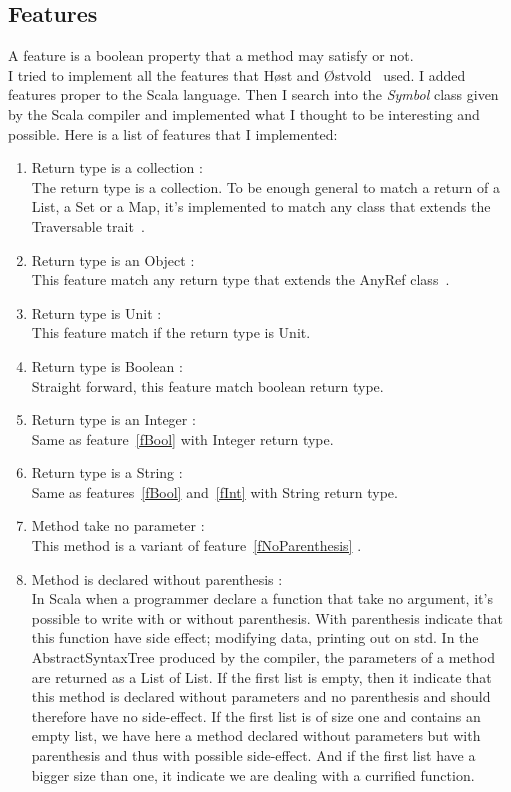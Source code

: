 \documentclass[12pt]{article}
\begin{document}
\subsection{Features}
\label{features}
A feature is a boolean property that a method may satisfy or not.\\
I tried to implement all the features that H{\o}st and {\O}stvold~\cite{DebugMN} used. I added features proper to the Scala language. Then I search into the \textit{Symbol} class given by the Scala compiler and implemented what I thought to be interesting and possible. Here is a list of features that I implemented:

\begin{enumerate}
\item Return type is a collection :\\
	The return type is a collection. To be enough general to match a return of a List, a Set or a Map, it's implemented to match any class that extends the Traversable trait~\cite{travers}.
\item Return type is an Object : \\
	This feature match any return type that extends the AnyRef class~\cite{anyRef}.
\item Return type is Unit :\\
	This feature match if the return type is Unit.
\item Return type is Boolean : \label{fBool}\\
	Straight forward, this feature match boolean return type.
\item Return type is an Integer :\label{fInt}\\
	Same as feature~\ref{fBool} with Integer return type.
\item Return type is a String : \\
	Same as features~\ref{fBool} and~\ref{fInt} with String return type.
\item Method take no parameter :\label{fNoParam}\\
	This method is a variant of feature~\ref{fNoParenthesis} .
\item Method is declared without parenthesis :\label{fNoParenthesis}\\
In Scala when a programmer declare a function that take no argument, it's possible to write with or without parenthesis. With parenthesis indicate that this function have side effect; modifying data, printing out on std. In the AbstractSyntaxTree produced by the compiler, the parameters of a method are returned as a List of List. If the first list is empty, then it indicate that this method is declared without parameters and no parenthesis and should therefore have no side-effect. If the first list is of size one and contains an empty list, we have here a method declared without parameters but with parenthesis and thus with possible side-effect. And if the first list have a bigger size than one, it indicate we are dealing with a currified function.

\end{enumerate}
\end{document}
